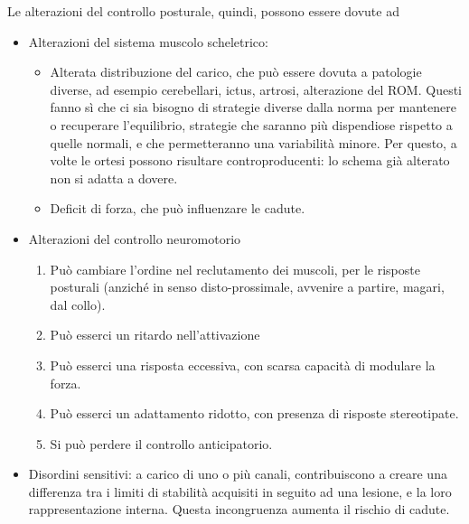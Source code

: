 Le alterazioni del controllo posturale, quindi, possono essere dovute ad
\begin{itemize}
\item Alterazioni del sistema muscolo scheletrico:
	\begin{itemize}
	\item Alterata distribuzione del carico, che può essere dovuta a patologie
	diverse, ad esempio cerebellari, ictus, artrosi, alterazione del ROM. Questi
	fanno sì che ci sia bisogno di strategie diverse dalla norma per mantenere
	o recuperare l'equilibrio, strategie che saranno più dispendiose rispetto a
	quelle normali, e che permetteranno una variabilità minore. Per questo, a volte
	le ortesi possono risultare controproducenti: lo schema già alterato non si
	adatta a dovere.
	\item Deficit di forza, che può influenzare le cadute.
	\end{itemize}
\item Alterazioni del controllo neuromotorio
	\begin{enumerate}
	\item Può cambiare l'ordine nel reclutamento dei muscoli, per le risposte
	posturali (anziché in senso disto-prossimale, avvenire a partire, magari, dal
	collo).
	\item Può esserci un ritardo nell'attivazione
	\item Può esserci una risposta eccessiva, con scarsa capacità di modulare la
	forza.
	\item Può esserci un adattamento ridotto, con presenza di risposte
	stereotipate.
	\item Si può perdere il controllo anticipatorio.
	\end{enumerate}
\item Disordini sensitivi: a carico di uno o più canali, contribuiscono a creare
una differenza tra i limiti di stabilità acquisiti in seguito ad una lesione, e
la loro rappresentazione interna. Questa incongruenza aumenta il rischio di
cadute.
\end{itemize}

